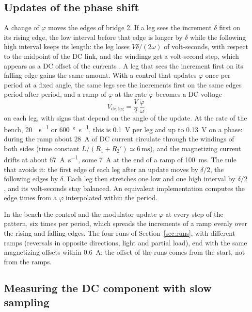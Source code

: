 \documentclass[12pt,a4paper]{scrartcl}
\newcommand{\ped}[1]{_{\mathrm{#1}}}
\begin{document}
\begin{onehalfspace}
\subsection{Updates of the phase shift}
\label{sec:update}

A change of $\varphi$ moves the edges of bridge 2. If a leg sees the increment $\delta$ first on its rising edge, the low interval before that edge is longer by $\delta$ while the following high interval keeps its length: the leg loses $V\delta/(2\omega)$ of volt-seconds, with respect to the midpoint of the DC link, and the windings get a volt-second step, which appears as a DC offset of the currents \cite{zhao2016}. A leg that sees the increment first on its falling edge gains the same amount. With a control that updates $\varphi$ once per period at a fixed angle, the same legs see the increments first on the same edges period after period, and a ramp of $\varphi$ at the rate $\dot\varphi$ becomes a DC voltage
\begin{equation}
	V\ped{dc,leg} = \frac{V}{2}\,\frac{\dot\varphi}{\omega}
	\label{eq:ramp}
\end{equation}
on each leg, with signs that depend on the angle of the update. At the rate of the bench, \SI{20}{\pu\per\second} or \SI{600}{\degree\per\second}, this is \SI{0.1}{\volt} per leg and up to \SI{0.13}{\volt} on a phase: during the ramp about \SI{28}{\ampere} of DC current circulate through the windings of both sides (time constant $L/(R\ped{1} + R\ped{2}') \simeq \SI{6}{\milli\second}$), and the magnetizing current drifts at about \SI{67}{\ampere\per\second}, some \SI{7}{\ampere} at the end of a ramp of \SI{100}{\milli\second}. The rule that avoids it: the first edge of each leg after an update moves by $\delta/2$, the following edges by $\delta$. Each leg then stretches one low and one high interval by $\delta/2$, and its volt-seconds stay balanced. An equivalent implementation computes the edge times from a $\varphi$ interpolated within the period.

In the bench the control and the modulator update $\varphi$ at every step of the pattern, six times per period, which spreads the increments of a ramp evenly over the rising and falling edges. The four runs of Section~\ref{sec:runs}, with different ramps (reversals in opposite directions, light and partial load), end with the same magnetizing offsets within \SI{0.6}{\ampere}: the offset of the runs comes from the start, not from the ramps.

\subsection{Measuring the DC component with slow sampling}
\label{sec:dc_measure}


\end{onehalfspace}
\end{document}
